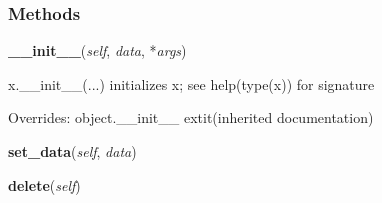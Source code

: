   \subsubsection{Methods}

    \vspace{0.5ex}

\hspace{.8\funcindent}\begin{boxedminipage}{\funcwidth}

    \raggedright \textbf{\_\_init\_\_}(\textit{self}, \textit{data}, *\textit{args})

\setlength{\parskip}{2ex}
    x.\_\_init\_\_(...) initializes x; see help(type(x)) for signature

\setlength{\parskip}{1ex}
      Overrides: object.\_\_init\_\_ 	extit{(inherited documentation)}

    \end{boxedminipage}

    \label{BookTable:BookTable:set_data}

    \vspace{0.5ex}

\hspace{.8\funcindent}\begin{boxedminipage}{\funcwidth}

    \raggedright \textbf{set\_data}(\textit{self}, \textit{data})

\setlength{\parskip}{2ex}
\setlength{\parskip}{1ex}
    \end{boxedminipage}

    \label{BookTable:BookTable:delete}

    \vspace{0.5ex}

\hspace{.8\funcindent}\begin{boxedminipage}{\funcwidth}

    \raggedright \textbf{delete}(\textit{self})

\setlength{\parskip}{2ex}
\setlength{\parskip}{1ex}
    \end{boxedminipage}

    \label{BookTable:BookTable:set_my_data}

